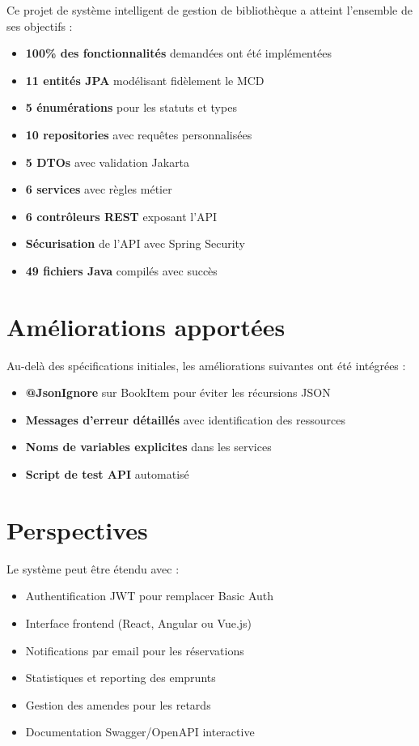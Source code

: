 \documentclass[12pt,a4paper,twoside]{report}
\begin{document}
Ce projet de système intelligent de gestion de bibliothèque a atteint l'ensemble de ses objectifs :

\begin{itemize}
    \item \textbf{100\% des fonctionnalités} demandées ont été implémentées
    \item \textbf{11 entités JPA} modélisant fidèlement le MCD
    \item \textbf{5 énumérations} pour les statuts et types
    \item \textbf{10 repositories} avec requêtes personnalisées
    \item \textbf{5 DTOs} avec validation Jakarta
    \item \textbf{6 services} avec règles métier
    \item \textbf{6 contrôleurs REST} exposant l'API
    \item \textbf{Sécurisation} de l'API avec Spring Security
    \item \textbf{49 fichiers Java} compilés avec succès
\end{itemize}

\section{Améliorations apportées}

Au-delà des spécifications initiales, les améliorations suivantes ont été intégrées :

\begin{itemize}
    \item \textbf{@JsonIgnore} sur BookItem pour éviter les récursions JSON
    \item \textbf{Messages d'erreur détaillés} avec identification des ressources
    \item \textbf{Noms de variables explicites} dans les services
    \item \textbf{Script de test API} automatisé
\end{itemize}

\section{Perspectives}

Le système peut être étendu avec :

\begin{itemize}
    \item Authentification JWT pour remplacer Basic Auth
    \item Interface frontend (React, Angular ou Vue.js)
    \item Notifications par email pour les réservations
    \item Statistiques et reporting des emprunts
    \item Gestion des amendes pour les retards
    \item Documentation Swagger/OpenAPI interactive
\end{itemize}
\end{document}
